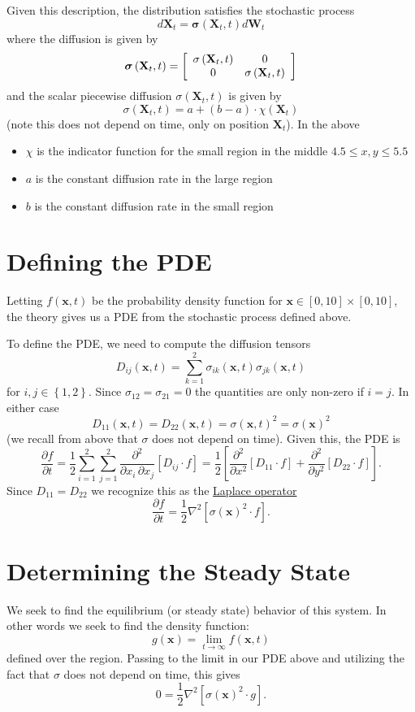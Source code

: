 \documentclass[a4paper,10pt]{article}
\begin{document}
Given this description, the distribution satisfies the stochastic process
\[d\mathbf{X}_t = \boldsymbol{\sigma}\left(\mathbf{X}_t, t\right) d
\mathbf{W}_t\]
where the diffusion is given by
\[\boldsymbol{\sigma}\left(\mathbf{X}_t, t\right) = \left[ \begin{array}{c c}
\sigma\left(\mathbf{X}_t, t\right) & 0 \\
0 & \sigma\left(\mathbf{X}_t, t\right)  \end{array}\right]\]
and the scalar piecewise diffusion \(\sigma\left(\mathbf{X}_t, t\right)\) is
given by
\[\sigma \left(\mathbf{X}_t, t\right) = a + (b - a) \cdot \chi
\left(\mathbf{X}_t\right)\]
(note this does not depend on time, only on position \(\mathbf{X}_t\)). In
the above
\begin{itemize}
\item \(\chi\) is the indicator function for the small region in
the middle \(4.5 \leq x, y \leq 5.5\)
\item \(a\) is the constant diffusion rate in the large region
\item \(b\) is the constant diffusion rate in the small region
\end{itemize}

\section{Defining the PDE}
Letting \(f(\mathbf{x}, t)\) be the probability density function for
\(\mathbf{x} \in \left[0, 10\right] \times \left[0, 10\right]\), the theory
gives us a PDE from the stochastic process defined above.

To define the PDE, we need to compute the diffusion tensors
\[D_{ij}(\mathbf{x}, t) = \sum_{k = 1}^2 \sigma_{ik}(\mathbf{x}, t)
\sigma_{jk}(\mathbf{x}, t)\]
for \(i, j \in \left\{1, 2\right\}\). Since \(\sigma_{12} = \sigma_{21} = 0\)
the quantities are only non-zero if \(i = j\). In either case
\[D_{11}(\mathbf{x}, t) = D_{22}(\mathbf{x}, t) =
\sigma \left(\mathbf{x}, t\right)^2 = \sigma \left(\mathbf{x}\right)^2\]
(we recall from above that \(\sigma\) does not depend on time).
Given this, the PDE is
\[\boxed{\frac{\partial f}{\partial t} = \frac{1}{2} \sum_{i = 1}^2
\sum_{j = 1}^2 \frac{\partial^2}{\partial x_i \, \partial x_j}
\left[D_{ij} \cdot f\right] = \frac{1}{2} \left[
\frac{\partial^2}{\partial x^2}
\left[D_{11} \cdot f\right] + \frac{\partial^2}{\partial y^2}
\left[D_{22} \cdot f\right]\right]}.\]
Since \(D_{11} = D_{22}\) we recognize this as the
\href{http://en.wikipedia.org/wiki/Laplace_operator}{Laplace operator}
\[\frac{\partial f}{\partial t} = \frac{1}{2} \nabla^2
\left[\sigma \left(\mathbf{x}\right)^2 \cdot f\right].\]

\section{Determining the Steady State}
We seek to find the equilibrium (or steady state) behavior of this system.
In other words we seek to find the density function:
\[g(\mathbf{x}) = \lim_{t \to \infty} f(\mathbf{x}, t)\]
defined over the region. Passing to the limit in our PDE above and
utilizing the fact that \(\sigma\) does not depend on time, this gives
\[0 = \frac{1}{2} \nabla^2 \left[\sigma \left(\mathbf{x}\right)^2
\cdot g\right].\]
\end{document}
